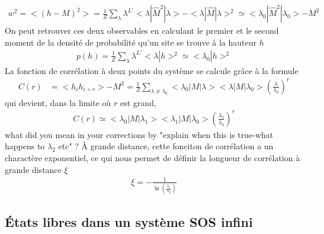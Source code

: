 \begin{align}
	w^2 = < (h - M)^2 > = \frac{1}{Z} \sum_\lambda \lambda^{L'} < \lambda | \hat{M}^2 | \lambda > - < \lambda | \hat{M}| \lambda >^2  \simeq  < \lambda_0 | \hat{M}^2 | \lambda_0 > - M^2
\end{align}
On peut retrouver ces deux observables en calculant le premier et le second moment de la densité de probabilité qu'un site se trouve à la hauteur $h$
\begin{align}
	p(h) = \frac{1}{Z} \sum_\lambda \lambda^{L'} <\lambda | h >^2 \simeq < \lambda_0 | h >^2
\end{align}
La fonction de corrélation à deux points du système se calcule grâce à la formule
\begin{align}
    C(r) &= < h_i h_{i+r} > - M^2 = \frac{1}{Z} \sum_{\lambda \neq \lambda_0} < \lambda_0 | M | \lambda > < \lambda | M | \lambda_0 > \left( \frac{\lambda}{\lambda_0} \right)^r  
\end{align}
qui devient, dans la limite où $r$ est grand, 
\begin{align}
    C(r) \simeq < \lambda_0 | M | \lambda_1 > < \lambda_1 | M | \lambda_0 > \left( \frac{\lambda_1}{\lambda_0} \right)^r
\end{align}
{\color{red} what did you mean in your corrections by "explain when this is true-what happens to $\lambda_2$ etc" ? }
À grande distance, cette fonciton de corrélation a un charactère exponentiel, ce qui nous permet de définir la longueur de corrélation à grande distance $\xi$
\begin{align}
    \xi = - \frac{1}{\ln(\frac{\lambda_1}{\lambda_0})}
    \label{longueur-correl-thermo}
\end{align}


	\subsection{États libres dans un système SOS infini}
	\label{par-stab}

